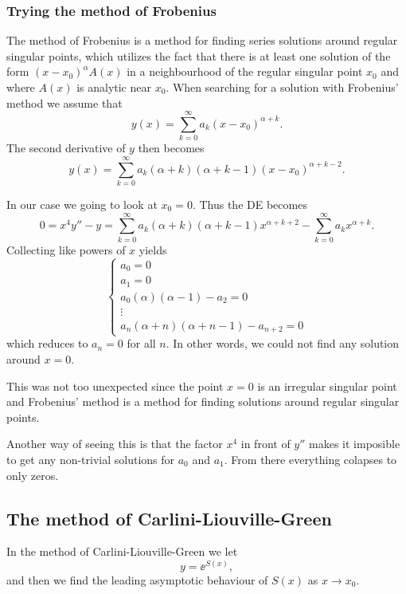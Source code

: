 \documentclass[11pt,letter, swedish, english
]{article}
\begin{document}
\subsubsection{Trying the method of Frobenius}
The method of Frobenius is a method for finding series solutions around
regular singular points, which utilizes the fact that there is 
at least one solution of the form $(x-x_0)^{\alpha}A(x)$ in a
neighbourhood of the regular singular point $x_0$ and where $A(x)$ is
analytic near $x_0$. When searching for a solution with Frobenius'
method we assume that
\begin{equation}
y(x)=\sum_{k=0}^\infty a_k (x-x_0)^{\alpha+k}.
\end{equation}
The second derivative of $y$ then becomes
\begin{equation}
y(x)=\sum_{k=0}^\infty a_k (\alpha+k)(\alpha+k-1) (x-x_0)^{\alpha+k-2}.
\end{equation}

In our case we going to look at $x_0=0$. Thus the DE becomes
\begin{equation}
0=x^4y''-y=
\sum_{k=0}^\infty a_k (\alpha+k)(\alpha+k-1) x^{\alpha+k+2}
-\sum_{k=0}^\infty a_k x^{\alpha+k}.
\end{equation}
Collecting like powers of $x$ yields
\begin{equation}
\begin{cases}
a_0=0\\
a_1=0\\
a_0(\alpha)(\alpha-1)-a_2=0\\
\vdots\\
a_n(\alpha+n)(\alpha+n-1)-a_{n+2}=0
\end{cases}
\end{equation}
which reduces to $a_n=0$ for all $n$. In other words, we could not
find any solution around $x=0$.

This was not too unexpected since the point $x=0$ is an irregular
singular point and Frobenius' method is a method for finding solutions
around regular singular points. 

Another way of seeing this is that the factor $x^4$ in front of $y''$
makes it imposible to get any non-trivial solutions for $a_0$ and
$a_1$. From there everything colapses to only zeros.


\subsection{The method of Carlini-Liouville-Green}
In the method of Carlini-Liouville-Green we let
\begin{equation}
y=\ee^{S(x)},
\end{equation}
and then we find the leading asymptotic behaviour of $S(x)$ as
$x\to x_0$. 
\end{document}
